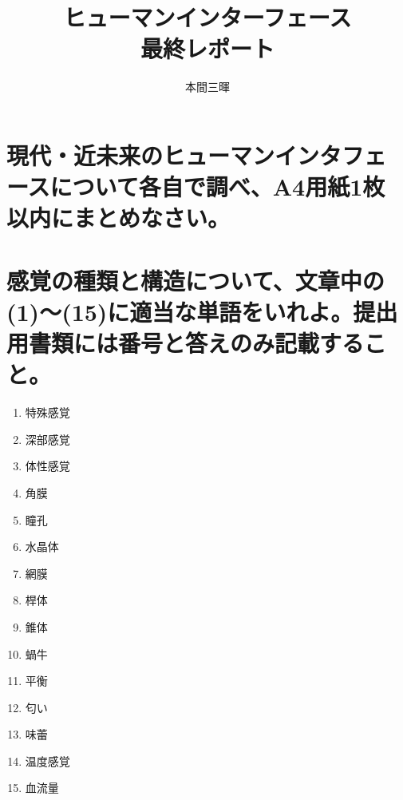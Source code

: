 \documentclass[titlepage,a4paper]{jsarticle}
\title{ヒューマンインターフェース\\最終レポート}
\author{本間三暉}
\begin{document}
\maketitle
\section{現代・近未来のヒューマンインタフェースについて各自で調べ、A4用紙1枚 以内にまとめなさい。}%

\section{感覚の種類と構造について、文章中の(1)〜(15)に適当な単語をいれよ。提出用書類には番号と答えのみ記載すること。}%
\begin{enumerate}
  \item 特殊感覚
  \item 深部感覚
  \item 体性感覚
  \item 角膜
  \item 瞳孔
  \item 水晶体
  \item 網膜
  \item 桿体
  \item 錐体
  \item 蝸牛
  \item 平衡
  \item 匂い
  \item 味蕾
  \item 温度感覚
  \item 血流量
\end{enumerate}
\end{document}
